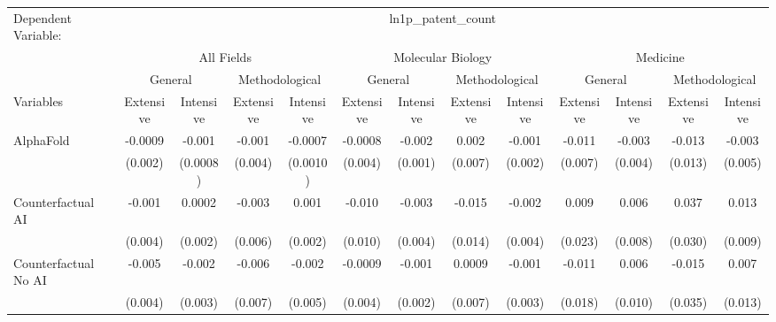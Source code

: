 \begingroup
\centering
\begin{tabular}{lcccccccccccc}
   \tabularnewline \midrule \midrule
   Dependent Variable: & \multicolumn{12}{c}{ln1p\_patent\_count}\\
 & \multicolumn{4}{c}{All Fields} & \multicolumn{4}{c}{Molecular Biology} & \multicolumn{4}{c}{Medicine} \\
\cmidrule(lr){2-5} \cmidrule(lr){6-9} \cmidrule(lr){10-13}
 & \multicolumn{2}{c}{General} & \multicolumn{2}{c}{Methodological} & \multicolumn{2}{c}{General} & \multicolumn{2}{c}{Methodological} & \multicolumn{2}{c}{General} & \multicolumn{2}{c}{Methodological} \\
\cmidrule(lr){2-3} \cmidrule(lr){4-5} \cmidrule(lr){6-7} \cmidrule(lr){8-9} \cmidrule(lr){10-11} \cmidrule(lr){12-13}
Variables & \multicolumn{1}{c}{Extensive} & \multicolumn{1}{c}{Intensive} & \multicolumn{1}{c}{Extensive} & \multicolumn{1}{c}{Intensive} & \multicolumn{1}{c}{Extensive} & \multicolumn{1}{c}{Intensive} & \multicolumn{1}{c}{Extensive} & \multicolumn{1}{c}{Intensive} & \multicolumn{1}{c}{Extensive} & \multicolumn{1}{c}{Intensive} & \multicolumn{1}{c}{Extensive} & \multicolumn{1}{c}{Intensive} \\
\cmidrule(lr){1-1}\cmidrule(lr){2-2} \cmidrule(lr){3-3} \cmidrule(lr){4-4} \cmidrule(lr){5-5} \cmidrule(lr){6-6} \cmidrule(lr){7-7} \cmidrule(lr){8-8} \cmidrule(lr){9-9} \cmidrule(lr){10-10} \cmidrule(lr){11-11} \cmidrule(lr){12-12} \cmidrule(lr){13-13}
   AlphaFold                                & -0.0009 & -0.001   & -0.001  & -0.0007  & -0.0008 & -0.002   & 0.002   & -0.001   & -0.011  & -0.003        & -0.013  & -0.003\\   
                                            & (0.002) & (0.0008) & (0.004) & (0.0010) & (0.004) & (0.001)  & (0.007) & (0.002)  & (0.007) & (0.004)       & (0.013) & (0.005)\\   
   Counterfactual AI                        & -0.001  & 0.0002   & -0.003  & 0.001    & -0.010  & -0.003   & -0.015  & -0.002   & 0.009   & 0.006         & 0.037   & 0.013\\   
                                            & (0.004) & (0.002)  & (0.006) & (0.002)  & (0.010) & (0.004)  & (0.014) & (0.004)  & (0.023) & (0.008)       & (0.030) & (0.009)\\   
   Counterfactual No AI                     & -0.005  & -0.002   & -0.006  & -0.002   & -0.0009 & -0.001   & 0.0009  & -0.001   & -0.011  & 0.006         & -0.015  & 0.007\\   
                                            & (0.004) & (0.003)  & (0.007) & (0.005)  & (0.004) & (0.002)  & (0.007) & (0.003)  & (0.018) & (0.010)       & (0.035) & (0.013)\\   

\end{tabular}
